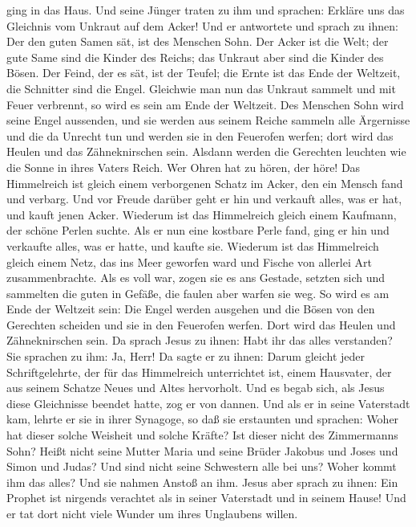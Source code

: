 ging in das Haus. Und seine Jünger traten zu ihm und sprachen: Erkläre
uns das Gleichnis vom Unkraut auf dem Acker!  Und er
antwortete und sprach zu ihnen: Der den guten Samen sät, ist des
Menschen Sohn.  Der Acker ist die Welt; der gute Same
sind die Kinder des Reichs; das Unkraut aber sind die Kinder des Bösen.
 Der Feind, der es sät, ist der Teufel; die Ernte ist das
Ende der Weltzeit, die Schnitter sind die Engel. 
Gleichwie man nun das Unkraut sammelt und mit Feuer verbrennt, so wird
es sein am Ende der Weltzeit.  Des Menschen Sohn wird
seine Engel aussenden, und sie werden aus seinem Reiche sammeln alle
Ärgernisse und die da Unrecht tun  und werden sie in den
Feuerofen werfen; dort wird das Heulen und das Zähneknirschen sein.
 Alsdann werden die Gerechten leuchten wie die Sonne in
ihres Vaters Reich. Wer Ohren hat zu hören, der höre! 
Das Himmelreich ist gleich einem verborgenen Schatz im Acker, den ein
Mensch fand und verbarg. Und vor Freude darüber geht er hin und verkauft
alles, was er hat, und kauft jenen Acker.  Wiederum ist
das Himmelreich gleich einem Kaufmann, der schöne Perlen suchte.
 Als er nun eine kostbare Perle fand, ging er hin und
verkaufte alles, was er hatte, und kaufte sie.  Wiederum
ist das Himmelreich gleich einem Netz, das ins Meer geworfen ward und
Fische von allerlei Art zusammenbrachte.  Als es voll
war, zogen sie es ans Gestade, setzten sich und sammelten die guten in
Gefäße, die faulen aber warfen sie weg.  So wird es am
Ende der Weltzeit sein: Die Engel werden ausgehen und die Bösen von den
Gerechten scheiden  und sie in den Feuerofen werfen. Dort
wird das Heulen und Zähneknirschen sein.  Da sprach Jesus
zu ihnen: Habt ihr das alles verstanden? Sie sprachen zu ihm: Ja, Herr!
 Da sagte er zu ihnen: Darum gleicht jeder
Schriftgelehrte, der für das Himmelreich unterrichtet ist, einem
Hausvater, der aus seinem Schatze Neues und Altes hervorholt.
 Und es begab sich, als Jesus diese Gleichnisse beendet
hatte, zog er von dannen.  Und als er in seine Vaterstadt
kam, lehrte er sie in ihrer Synagoge, so daß sie erstaunten und
sprachen: Woher hat dieser solche Weisheit und solche Kräfte?
 Ist dieser nicht des Zimmermanns Sohn? Heißt nicht seine
Mutter Maria und seine Brüder Jakobus und Joses und Simon und Judas?
 Und sind nicht seine Schwestern alle bei uns? Woher
kommt ihm das alles?  Und sie nahmen Anstoß an ihm. Jesus
aber sprach zu ihnen: Ein Prophet ist nirgends verachtet als in seiner
Vaterstadt und in seinem Hause!  Und er tat dort nicht
viele Wunder um ihres Unglaubens willen.

